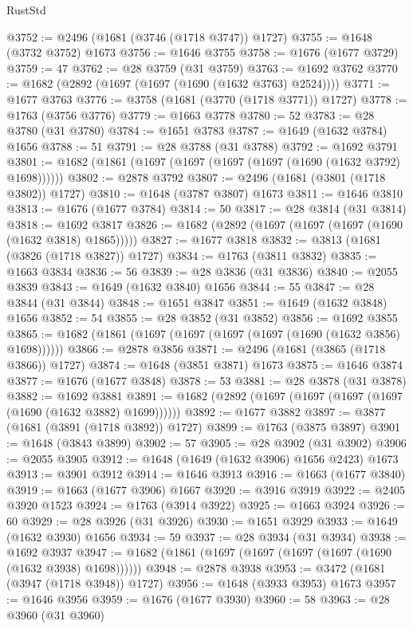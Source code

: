 \begin{lexlean}{RustStd}
\begin{coremodule}
@3752 := @2496 (@1681 (@3746 (@1718 @3747)) @1727)
@3755 := @1648 (@3732 @3752) @1673
@3756 := @1646 @3755
@3758 := @1676 (@1677 @3729)
@3759 := 47
@3762 := @28 @3759 (@31 @3759)
@3763 := @1692 @3762
@3770 := @1682 (@2892 (@1697 (@1697 (@1690 (@1632 @3763) @2524))))
@3771 := @1677 @3763
@3776 := @3758 (@1681 (@3770 (@1718 @3771)) @1727)
@3778 := @1763 (@3756 @3776)
@3779 := @1663 @3778
@3780 := 52
@3783 := @28 @3780 (@31 @3780)
@3784 := @1651 @3783
@3787 := @1649 (@1632 @3784) @1656
@3788 := 51
@3791 := @28 @3788 (@31 @3788)
@3792 := @1692 @3791
@3801 := @1682 (@1861 (@1697 (@1697 (@1697 (@1697 (@1690 (@1632 @3792) @1698))))))
@3802 := @2878 @3792
@3807 := @2496 (@1681 (@3801 (@1718 @3802)) @1727)
@3810 := @1648 (@3787 @3807) @1673
@3811 := @1646 @3810
@3813 := @1676 (@1677 @3784)
@3814 := 50
@3817 := @28 @3814 (@31 @3814)
@3818 := @1692 @3817
@3826 := @1682 (@2892 (@1697 (@1697 (@1697 (@1690 (@1632 @3818) @1865)))))
@3827 := @1677 @3818
@3832 := @3813 (@1681 (@3826 (@1718 @3827)) @1727)
@3834 := @1763 (@3811 @3832)
@3835 := @1663 @3834
@3836 := 56
@3839 := @28 @3836 (@31 @3836)
@3840 := @2055 @3839
@3843 := @1649 (@1632 @3840) @1656
@3844 := 55
@3847 := @28 @3844 (@31 @3844)
@3848 := @1651 @3847
@3851 := @1649 (@1632 @3848) @1656
@3852 := 54
@3855 := @28 @3852 (@31 @3852)
@3856 := @1692 @3855
@3865 := @1682 (@1861 (@1697 (@1697 (@1697 (@1697 (@1690 (@1632 @3856) @1698))))))
@3866 := @2878 @3856
@3871 := @2496 (@1681 (@3865 (@1718 @3866)) @1727)
@3874 := @1648 (@3851 @3871) @1673
@3875 := @1646 @3874
@3877 := @1676 (@1677 @3848)
@3878 := 53
@3881 := @28 @3878 (@31 @3878)
@3882 := @1692 @3881
@3891 := @1682 (@2892 (@1697 (@1697 (@1697 (@1697 (@1690 (@1632 @3882) @1699))))))
@3892 := @1677 @3882
@3897 := @3877 (@1681 (@3891 (@1718 @3892)) @1727)
@3899 := @1763 (@3875 @3897)
@3901 := @1648 (@3843 @3899)
@3902 := 57
@3905 := @28 @3902 (@31 @3902)
@3906 := @2055 @3905
@3912 := @1648 (@1649 (@1632 @3906) @1656 @2423) @1673
@3913 := @3901 @3912
@3914 := @1646 @3913
@3916 := @1663 (@1677 @3840)
@3919 := @1663 (@1677 @3906) @1667
@3920 := @3916 @3919
@3922 := @2405 @3920 @1523
@3924 := @1763 (@3914 @3922)
@3925 := @1663 @3924
@3926 := 60
@3929 := @28 @3926 (@31 @3926)
@3930 := @1651 @3929
@3933 := @1649 (@1632 @3930) @1656
@3934 := 59
@3937 := @28 @3934 (@31 @3934)
@3938 := @1692 @3937
@3947 := @1682 (@1861 (@1697 (@1697 (@1697 (@1697 (@1690 (@1632 @3938) @1698))))))
@3948 := @2878 @3938
@3953 := @3472 (@1681 (@3947 (@1718 @3948)) @1727)
@3956 := @1648 (@3933 @3953) @1673
@3957 := @1646 @3956
@3959 := @1676 (@1677 @3930)
@3960 := 58
@3963 := @28 @3960 (@31 @3960)

\end{coremodule}
\end{lexlean}
